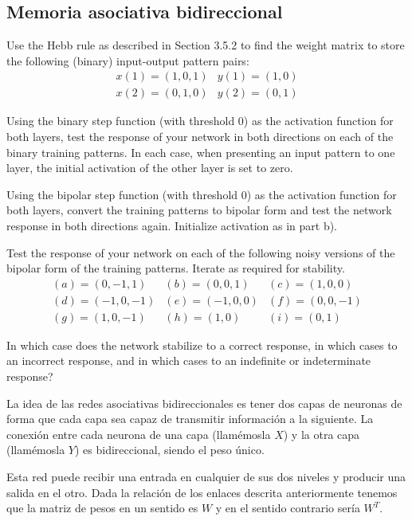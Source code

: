 \subsection{Memoria asociativa bidireccional}\label{sec:MemoriaAsociativaBidireccional}

\begin{problem}[10]
\ppart Use the Hebb rule as described in Section 3.5.2 to find the weight matrix to store
the following (binary) input-output pattern pairs:
\[\begin{array}{ll}
x(1)=(1,0,1) & y(1)=(1,0)\\
x(2) = (0,1,0) & y(2) = (0,1)
\end{array}\]

\ppart Using the binary step function (with threshold 0) as the activation function for both layers, test the response of your network in both directions on each of the
binary training patterns. In each case, when presenting an input pattern to one
layer, the initial activation of the other layer is set to zero.

\ppart Using the bipolar step function (with threshold 0) as the activation function for both layers, convert the training patterns to bipolar form and test the network response in both directions again. Initialize activation as in part b).

\ppart Test the response of your network on each of the following noisy versions of the bipolar form of the training patterns. Iterate as required for stability.
\[\begin{array}{lll}
(a)=(0,-1,1) & (b)=(0,0,1) & (c) = (1,0,0)\\
(d)=(-1,0,-1) & (e) = (-1,0,0) & (f) = (0,0,-1) \\
(g) = (1,0,-1) & (h)=(1,0) & (i) = (0,1)
\end{array}\]

\ppart  In which case does the network stabilize to a correct response, in which cases to an incorrect response, and in which cases to an indefinite or indeterminate response?

\solution
{}

La idea de las redes asociativas bidireccionales es tener dos capas de neuronas de forma que cada capa sea capaz de transmitir información a la siguiente. La conexión entre cada neurona de una capa (llamémosla $X$) y la otra capa (llamémosla $Y$) es bidireccional, siendo el peso único.

Esta red puede recibir una entrada en cualquier de sus dos niveles y producir una salida en el otro. Dada la relación de los enlaces descrita anteriormente tenemos que la matriz de pesos en un sentido es $W$ y en el sentido contrario sería $W^T$.


\end{problem}

